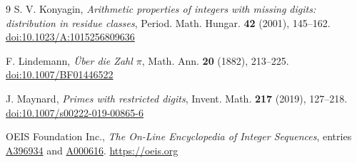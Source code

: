\documentclass[11pt]{amsart}
\theoremstyle{definition}
\theoremstyle{remark}
\begin{document}
\begin{thebibliography}{9}
S. V. Konyagin, \emph{Arithmetic properties of integers with missing digits: distribution in residue classes}, Period. Math. Hungar. \textbf{42} (2001), 145--162. \href{https://doi.org/10.1023/A:1015256809636}{doi:10.1023/A:1015256809636}

F. Lindemann, \emph{\"Uber die Zahl $\pi$}, Math. Ann. \textbf{20} (1882), 213--225. \href{https://doi.org/10.1007/BF01446522}{doi:10.1007/BF01446522}

J. Maynard, \emph{Primes with restricted digits}, Invent. Math. \textbf{217} (2019), 127--218. \href{https://doi.org/10.1007/s00222-019-00865-6}{doi:10.1007/s00222-019-00865-6}

OEIS Foundation Inc., \emph{The On-Line Encyclopedia of Integer Sequences}, entries \href{https://oeis.org/A396934}{A396934} and \href{https://oeis.org/A000616}{A000616}. \url{https://oeis.org}

\end{thebibliography}
\end{document}
